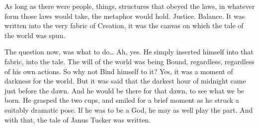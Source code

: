 As long as there were people, things, structures that obeyed the laws, in whatever form those laws would take, the metaphor would hold. Justice. Balance. It was written into the very fabric of Creation, it was the canvas on which the tale of the world was spun.

The question now, was what to do… Ah, yes. He simply inserted himself into that fabric, into the tale. The will of the world was being Bound, regardless, regardless of his own actions. So why not Bind himself to it? Yes, it was a moment of darkness for the world. But it was said that the darkest hour of midnight came just before the dawn. And he would be there for that dawn, to see what we be born.
\SmallVSpace
He grasped the two cups, and smiled for a brief moment as he struck a suitably dramatic pose. If he was to be a God, he may as well play the part.
\SomeVSpace
And with that, the tale of Janus Tucker was written.
\simpleline
{}

